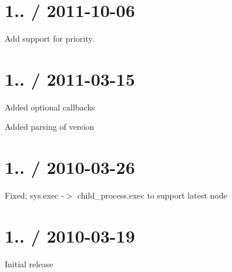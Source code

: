 \section*{1.. / 2011-\/10-\/06 }


\begin{DoxyItemize}
\item Add support for priority.
\end{DoxyItemize}

\section*{1.. / 2011-\/03-\/15 }


\begin{DoxyItemize}
\item Added optional callbacks
\item Added parsing of version
\end{DoxyItemize}

\section*{1.. / 2010-\/03-\/26 }


\begin{DoxyItemize}
\item Fixed; sys.\+exec -\/$>$ child\+\_\+process.\+exec to support latest node
\end{DoxyItemize}

\section*{1.. / 2010-\/03-\/19 }


\begin{DoxyItemize}
\item Initial release 
\end{DoxyItemize}